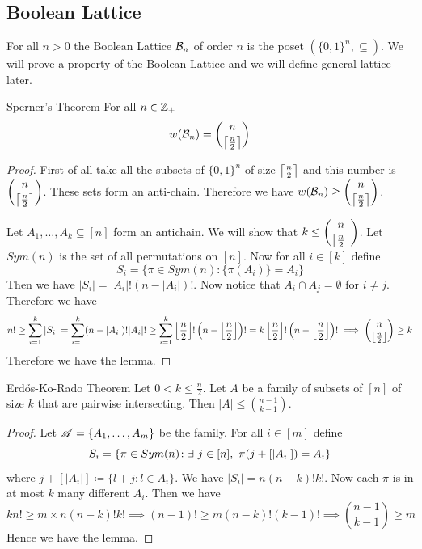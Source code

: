 \subsection{Boolean Lattice}
For all $n>0$ the Boolean Lattice $\mathcal{B}_n$ of order $n$ is the poset $(\{0,1\}^n,\subseteq)$. We will prove a property of the Boolean Lattice and we will define general lattice later.
\begin{Theorem}{Sperner's Theorem}{}
	For all $n\in \mathbb{Z}_+$ $$w(\mathcal{B}_n)=\binom{n}{\left\lceil\frac{n}2\right\rceil}$$
\end{Theorem}
\begin{proof}
	First of all take all the subsets of $\{0,1\}^n$ of size $\left\lceil\frac{n}2\right\rceil$ and this number is $\displaystyle{\binom{n}{\left\lceil\frac{n}2\right\rceil}}$. These sets form an anti-chain. Therefore we have $w(\mathcal{B}_n)\geq \displaystyle{\binom{n}{\left\lceil\frac{n}2\right\rceil}}$.
	
	Let $A_1,\dots, A_k\subseteq [n]$ form an antichain. We will show that $k\leq \displaystyle{\binom{n}{\left\lceil\frac{n}2\right\rceil}}$.	Let $Sym(n)$ is the set of all permutations on $[n]$. Now for all $i\in[k]$ define $$S_i=\{\pi\in Sym(n)\colon \{\pi(A_i)\}=A_i\}$$Then we have $|S_i|=|A_i|!(n-|A_i|)!$. Now notice that $A_i\cap A_j=\emptyset$ for $i\neq j$. Therefore we have $$n!\geq\sum_{i=1}^k|S_i|=\sum_{i=1}^k(n-|A_i|)!|A_i|!\geq \sum_{i=1}^k\left\lfloor\frac{n}2\right\rfloor!\left(n-\left\lfloor\frac{n}2\right\rfloor\right)!=k\left\lfloor\frac{n}2\right\rfloor!\left(n-\left\lfloor\frac{n}2\right\rfloor\right)!\implies \binom{n}{\left\lfloor\frac{n}2\right\rfloor}\geq k$$Therefore we have the lemma.
\end{proof}
\begin{Theorem}{Erd\H{o}s-Ko-Rado Theorem}{}
	Let $0<k\leq \frac{n}{2}$. Let $A$ be a family of   subsets of $[n]$ of size $k$ that are pairwise intersecting. Then $|A|\leq \binom{n-1}{k-1}$.
\end{Theorem}
\begin{proof}
	Let ${\mathscr{A}}=\{A_1,\dots, A_m\}$ be the family. For all $i\in[m]$ define $$S_i=\{\pi\in Sym(n)\colon \exs\ j\in[n],\ \pi(j+[|A_i|])=A_i\}$$where $j+[|A_i|]\coloneqq \{l+j\colon l\in A_i\}$. We have $|S_i|=n(n-k)!k!$. Now each $\pi$ is in at most $k$ many different $A_i$. Then we have $$kn!\geq m\times n(n-k)!k!\implies (n-1)!\geq m(n-k)!(k-1)!\implies \binom{n-1}{k-1}\geq m$$Hence we have the lemma.
\end{proof}
